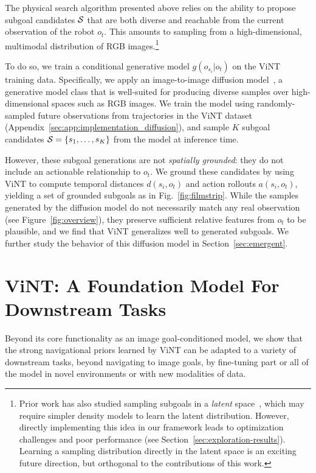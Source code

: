 \documentclass{article}
\newcommand{\ModelName}{ViNT\xspace}
\begin{document}
The physical search algorithm presented above relies on the ability to propose subgoal candidates ${\mathcal{S}}$ that are both diverse and reachable from the current observation of the robot $o_t$. This amounts to sampling from a high-dimensional, multimodal distribution of RGB images.\footnote{Prior work has also studied sampling subgoals in a \emph{latent} space~\cite{shah2021rapid}, which may require simpler density models to learn the latent distribution. However, directly implementing this idea in our framework leads to optimization challenges and poor performance (see Section~\ref{sec:exploration-results}). Learning a sampling distribution directly in the latent space \cite{rombach2022highresolution} is an exciting future direction, but orthogonal to the contributions of this work.}

To do so, we train a conditional generative model $g(o_{s_i} | o_t)$ on the \ModelName training data. Specifically, we apply an image-to-image diffusion model~\cite{ho2020denoising, saharia2022palette}, a generative model class that is well-suited for producing diverse samples over high-dimensional spaces such as RGB images. We train the model using randomly-sampled future observations from trajectories in the \ModelName dataset (Appendix~\ref{sec:app:implementation_diffusion}), and sample $K$ subgoal candidates ${\mathcal{S}} = \{s_1, \ldots, s_K\}$ from the model at inference time. 

However, these subgoal generations are not \emph{spatially grounded}: they do not include an actionable relationship to $o_t$. We ground these candidates by using \ModelName to compute temporal distances $d(s_i, o_t)$ and action rollouts $a(s_i, o_t)$, yielding a set of grounded subgoals as in Fig.~\ref{fig:filmstrip}. While the samples generated by the diffusion model do not necessarily match any real observation (see Figure~\ref{fig:overview}),
they preserve sufficient relative features from $o_t$ to be plausible, and we find that \ModelName generalizes well to generated subgoals. We further study the behavior of this diffusion model in Section~\ref{sec:emergent}.


\section{\ModelName: A Foundation Model For Downstream Tasks}
\label{sec:method_finetuning}


Beyond its core functionality as an image goal-conditioned model, we show that the strong navigational priors learned by \ModelName can be adapted to a variety of downstream tasks, beyond navigating to image goals, by fine-tuning part or all of the model in novel environments or with new modalities of data.
\end{document}
